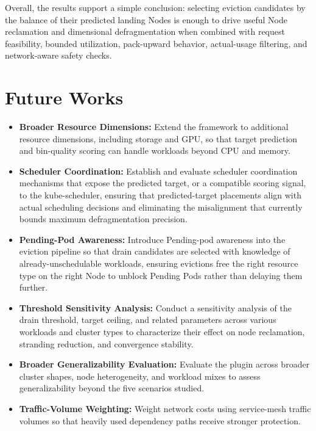 Overall, the results support a simple conclusion: selecting eviction candidates by the balance of their predicted landing Nodes is enough to drive useful Node reclamation and dimensional defragmentation when combined with request feasibility, bounded utilization, pack-upward behavior, actual-usage filtering, and network-aware safety checks.

\section{Future Works}
\label{sec:future_works}

\begin{itemize}
    \item \textbf{Broader Resource Dimensions:} Extend the framework to additional resource dimensions, including storage and GPU, so that target prediction and bin-quality scoring can handle workloads beyond CPU and memory.
    \item \textbf{Scheduler Coordination:} Establish and evaluate scheduler coordination mechanisms that expose the predicted target, or a compatible scoring signal, to the kube-scheduler, ensuring that predicted-target placements align with actual scheduling decisions and eliminating the misalignment that currently bounds maximum defragmentation precision.
    \item \textbf{Pending-Pod Awareness:} Introduce Pending-pod awareness into the eviction pipeline so that drain candidates are selected with knowledge of already-unschedulable workloads, ensuring evictions free the right resource type on the right Node to unblock Pending Pods rather than delaying them further.
    \item \textbf{Threshold Sensitivity Analysis:} Conduct a sensitivity analysis of the drain threshold, target ceiling, and related parameters across various workloads and cluster types to characterize their effect on node reclamation, stranding reduction, and convergence stability.
    \item \textbf{Broader Generalizability Evaluation:} Evaluate the plugin across broader cluster shapes, node heterogeneity, and workload mixes to assess generalizability beyond the five scenarios studied.
    \item \textbf{Traffic-Volume Weighting:} Weight network costs using service-mesh traffic volumes so that heavily used dependency paths receive stronger protection.
\end{itemize}
